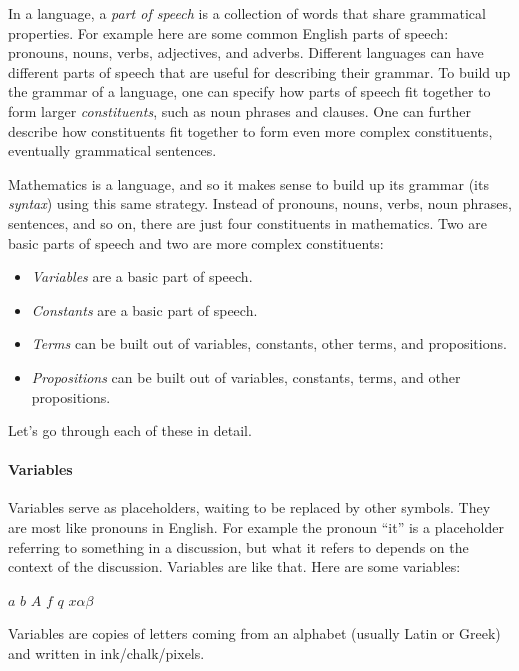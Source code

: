 \documentclass[12pt]{article}
\begin{document}
In a language, a \emph{part of speech} is a collection of words that share grammatical properties.
For example here are some common English parts of speech: pronouns, nouns, verbs, adjectives, and adverbs.
Different languages can have different parts of speech that are useful for describing their grammar.
To build up the grammar of a language, one can specify how parts of speech fit together to form larger
\emph{constituents}, such as noun phrases and clauses. One can further describe how
constituents fit together to form even more complex constituents, eventually grammatical sentences.

Mathematics is a language, and so it makes sense to build up its grammar (its \emph{syntax}) using this same strategy.
Instead of pronouns, nouns, verbs, noun phrases, sentences, and so on, there are just four constituents in
mathematics. Two are basic parts of speech and two are more complex constituents:
\begin{itemize}
\item \emph{Variables} are a basic part of speech.
\item \emph{Constants} are a basic part of speech.
\item \emph{Terms} can be built out of variables, constants, other terms, and propositions.
\item \emph{Propositions} can be built out of variables, constants, terms, and other propositions.
\end{itemize}

Let's go through each of these in detail.

\def\sp{\hspace{1em}}
\paragraph{Variables}
Variables serve as placeholders, waiting to be replaced by other symbols.
They are most like pronouns in English.
For example the pronoun ``it'' is a placeholder referring to something in a discussion, but what it refers to depends on the context of the discussion.
Variables are like that.
Here are some variables:
\begin{center}
$a$ \sp $b$ \sp $A$ \sp $f$ \sp $q$ \sp $x$\sp $\alpha$\sp $\beta$
\end{center}
Variables are copies of letters coming from an alphabet (usually Latin or Greek) and written in ink/chalk/pixels.



\def\sp{\hspace{1em}}
\end{document}
